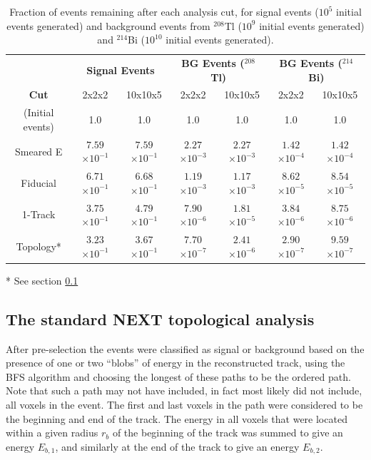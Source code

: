 \documentclass[a4paper,11pt]{article}
\begin{document}
\begin{table}[!htb]
	\begin{center}
		\caption[Fast analysis summary]{\label{tbl.FastAnalysisResults}Fraction of events remaining after each analysis cut, for signal events ($10^5$ initial events generated) and background events from $^{208}$Tl ($10^{9}$ initial events generated) and $^{214}$Bi ($10^{10}$ initial events generated).}
		\begin{tabular}{c|cc|cc|cc}
			\\
			 & \multicolumn{2}{c}{\textbf{Signal Events}} & \multicolumn{2}{c}{\textbf{BG Events ($^{208}$Tl)}} & \multicolumn{2}{c}{\textbf{BG Events ($^{214}$Bi)}}\\
			\textbf{Cut} & 2x2x2 & 10x10x5 & 2x2x2 & 10x10x5 & 2x2x2 & 10x10x5\\
			\hline
			(Initial events) & 1.0 & 1.0 & 1.0 & 1.0 & 1.0 & 1.0\\
			Smeared E & $7.59$\small{$\times 10^{-1}$} & $7.59$\small{$\times 10^{-1}$} & $2.27$\small{$\times 10^{-3}$} & $2.27$\small{$\times 10^{-3}$} & $1.42$\small{$\times 10^{-4}$} & $1.42$\small{$\times 10^{-4}$}\\
			Fiducial & $6.71$\small{$\times 10^{-1}$} & $6.68$\small{$\times 10^{-1}$} & $1.19$\small{$\times 10^{-3}$} & $1.17$\small{$\times 10^{-3}$} & $8.62$\small{$\times 10^{-5}$} & $8.54$\small{$\times 10^{-5}$}\\
			1-Track & $3.75$\small{$\times 10^{-1}$} & $4.79$\small{$\times 10^{-1}$} & $7.90$\small{$\times 10^{-6}$} & $1.81$\small{$\times 10^{-5}$} & $3.84$\small{$\times 10^{-6}$} & $8.75$\small{$\times 10^{-6}$}\\
			Topology* & $3.23$\small{$\times 10^{-1}$} & $3.67$\small{$\times 10^{-1}$} & $7.70$\small{$\times 10^{-7}$} & $2.41$\small{$\times 10^{-6}$} & $2.90$\small{$\times 10^{-7}$} & $9.59$\small{$\times 10^{-7}$}\\
		\end{tabular}
	\end{center}
	* See section \ref{ssec:TopologicalAnalysis}
\end{table}

\subsection{The standard NEXT topological analysis}
\label{ssec:TopologicalAnalysis}
After pre-selection the events were classified as signal or background based on the presence of one or two ``blobs'' of energy in the
reconstructed track, using the BFS algorithm and choosing the longest of these paths to be the ordered path.  Note that such a path may not have included, 
in fact most likely did not include, all voxels in the event.  The first and last voxels in the path
were considered to be the beginning and end of the track.  The energy in all voxels that were located within a given radius $r_b$ of the beginning of the track was summed to give
an energy $E_{b,1}$, and similarly at the end of the track to give an energy $E_{b,2}$.  
\end{document}

